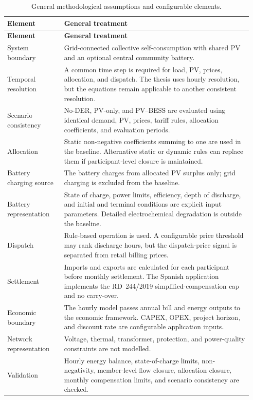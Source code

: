 \begin{longtable}{p{}p{}}
\caption{General methodological assumptions and configurable elements.}\label{tab:general_methodological_boundaries}\\
\toprule
\textbf{Element} & \textbf{General treatment} \\
\midrule
\endfirsthead
\toprule
\textbf{Element} & \textbf{General treatment} \\
\midrule
\endhead
System boundary & Grid-connected collective self-consumption with shared PV and an optional central community battery. \\
Temporal resolution & A common time step is required for load, PV, prices, allocation, and dispatch. The thesis uses hourly resolution, but the equations remain applicable to another consistent resolution. \\
Scenario consistency & No-DER, PV-only, and PV--BESS are evaluated using identical demand, PV, prices, tariff rules, allocation coefficients, and evaluation periods. \\
Allocation & Static non-negative coefficients summing to one are used in the baseline. Alternative static or dynamic rules can replace them if participant-level closure is maintained. \\
Battery charging source & The battery charges from allocated PV surplus only; grid charging is excluded from the baseline. \\
Battery representation & State of charge, power limits, efficiency, depth of discharge, and initial and terminal conditions are explicit input parameters. Detailed electrochemical degradation is outside the baseline. \\
Dispatch & Rule-based operation is used. A configurable price threshold may rank discharge hours, but the dispatch-price signal is separated from retail billing prices. \\
Settlement & Imports and exports are calculated for each participant before monthly settlement. The Spanish application implements the RD~244/2019 simplified-compensation cap and no carry-over. \\
Economic boundary & The hourly model passes annual bill and energy outputs to the economic framework. CAPEX, OPEX, project horizon, and discount rate are configurable application inputs. \\
Network representation & Voltage, thermal, transformer, protection, and power-quality constraints are not modelled. \\
Validation & Hourly energy balance, state-of-charge limits, non-negativity, member-level flow closure, allocation closure, monthly compensation limits, and scenario consistency are checked. \\
\bottomrule
\end{longtable}

